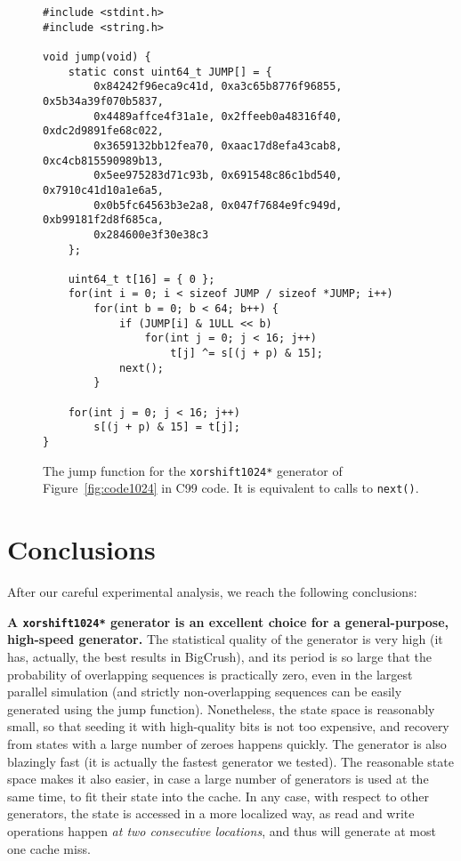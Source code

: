 \documentclass{acmsmalltr}
\newcommand{\xorshifts}[1][]{\texttt{xorshift#1*}\xspace}
\begin{document}
\begin{figure}[ht]
\centering
\begin{verbatim}
#include <stdint.h>
#include <string.h>

void jump(void) {
    static const uint64_t JUMP[] = {
        0x84242f96eca9c41d, 0xa3c65b8776f96855, 0x5b34a39f070b5837,
        0x4489affce4f31a1e, 0x2ffeeb0a48316f40, 0xdc2d9891fe68c022,
        0x3659132bb12fea70, 0xaac17d8efa43cab8, 0xc4cb815590989b13,
        0x5ee975283d71c93b, 0x691548c86c1bd540, 0x7910c41d10a1e6a5,
        0x0b5fc64563b3e2a8, 0x047f7684e9fc949d, 0xb99181f2d8f685ca,
        0x284600e3f30e38c3 
    };

    uint64_t t[16] = { 0 };
    for(int i = 0; i < sizeof JUMP / sizeof *JUMP; i++)
        for(int b = 0; b < 64; b++) {
            if (JUMP[i] & 1ULL << b)
                for(int j = 0; j < 16; j++)
                    t[j] ^= s[(j + p) & 15];
            next();
        }

    for(int j = 0; j < 16; j++)
        s[(j + p) & 15] = t[j];
}
\end{verbatim}
\caption{\label{fig:jump1024}The jump function for the \xorshifts[1024] generator of Figure~\ref{fig:code1024}
in C99 code. It is equivalent to  calls to \texttt{next()}.}
\end{figure}





\section{Conclusions}

After our careful experimental analysis, we reach the following conclusions:

\smallskip\noindent\textbf{A \xorshifts[1024] generator is an excellent choice for a
general-purpose, high-speed generator.} The statistical quality of the generator
is very high (it has, actually, the best results in BigCrush), and its period is
so large that the probability of overlapping sequences is practically zero, even
in the largest parallel simulation (and strictly non-overlapping sequences can be easily generated
using the jump function).
Nonetheless, the state space is reasonably small, so that seeding it with
high-quality bits is not too expensive, and recovery from states with a large
number of zeroes happens quickly. The generator is also blazingly fast (it
is actually the fastest generator we tested).
The reasonable state space makes it also easier, in case a large number
of generators is used at the same time, to fit their state into the
cache.
In any case, with respect to other generators, the state is accessed in a more
localized way, as read and write operations happen \emph{at two consecutive locations}, and thus will generate 
at most one cache miss.
\end{document}
